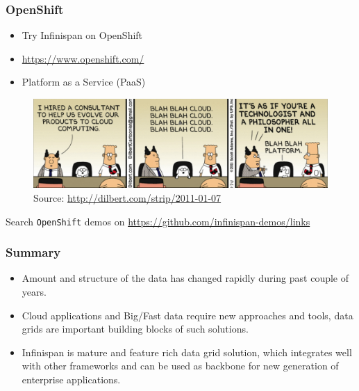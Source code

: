 \documentclass[10pt,utf8]{beamer}
\begin{document}
\begin{frame}
	\frametitle{OpenShift}
	\begin{itemize}
		\item Try Infinispan on OpenShift
		\item \color{blue}\url{https://www.openshift.com/}\color{black} 
		\item Platform as a Service (PaaS)
	\end{itemize}
	\begin{figure}
		\centering
		\includegraphics[width=12cm]{./img/platform.eps}
		\caption{\tiny{Source: \url{http://dilbert.com/strip/2011-01-07}}}
	\end{figure}
	\vspace{-0.5cm}
	Search \texttt{OpenShift} demos on \color{blue}\url{https://github.com/infinispan-demos/links}\color{black}
\end{frame}

\begin{frame}
	\frametitle{Summary}
	\begin{itemize}
		\pause
		\item Amount and structure of the data has changed rapidly during past couple of years.
		\pause
		\item Cloud applications and Big/Fast data require new approaches and tools, data grids are important building blocks of such solutions.
		\pause
		\item Infinispan is mature and feature rich data grid solution, which integrates well with other frameworks and can be used as backbone for new 
	 generation of enterprise applications.
	\end{itemize}
\end{frame}
\end{document}
